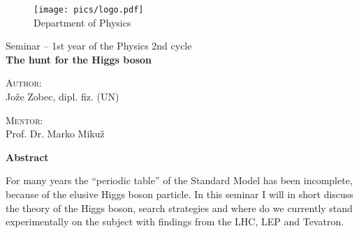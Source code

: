 \documentclass[a4paper, 12 pt, titlepage]{article}
\renewenvironment{abstract}[1][1.0]
{
	\begin{center}
		{\bf Abstract}\\[12pt]
		\begin{minipage}{#1\textwidth}
}
{
		\end{minipage}
	\end{center}
}
\begin{document}
\begin{titlepage}
	\begin{figure}[H]
		\centering
		\texttt{[image: pics/logo.pdf]}\\[12pt]
		{\sc Department of Physics}\\[4cm]
	\end{figure}
	\begin{center}
		\large{Seminar -- 1st year of the Physics 2nd cycle}\\[0.5cm]
		\LARGE\textbf{The hunt for the Higgs boson}\\[1.0cm]

		\vspace{0.0cm}

		\begin{minipage}{0.4\textwidth}\small
			\begin{flushleft}
			\textsc{Author:}\\[0.2cm]
			Jože Zobec, dipl. fiz. (UN)
			\end{flushleft}
		\end{minipage}
		\begin{minipage}{0.4\textwidth}\small
			\begin{flushright}
				\textsc{Mentor:}\\[0.2cm]
				Prof. Dr. Marko Mikuž
			\end{flushright}
		\end{minipage}
	\end{center}

	\vspace{5.0cm}

	\begin{abstract}
		For many years the ``periodic table'' of the Standard Model has been
		incomplete, because of the elusive Higgs boson particle. In this seminar I will
		in short discuss the theory of the Higgs boson, search strategies and where do
		we currently stand experimentally on the subject with findings from the LHC,
		LEP and Tevatron.
	\end{abstract}
	
	\vfill

\end{titlepage}

\tableofcontents

\pagebreak















\end{document}
